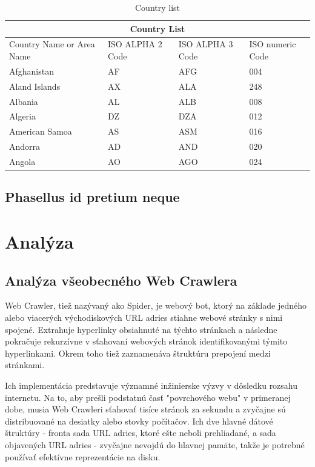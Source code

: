 \begin{table}[!ht]
	\caption{Country list}\label{t:1}
	\smallskip
	\centering

	\begin{tabular}{ |p{3cm}||p{3cm}|p{3cm}|p{3cm}|  }
		\hline
		\multicolumn{4}{|c|}{Country List} \\
		\hline
		Country Name or Area Name& ISO ALPHA 2 Code &ISO ALPHA 3 Code&ISO numeric Code\\
		\hline
		Afghanistan & AF & AFG & 004\\
		Aland Islands & AX & ALA & 248\\
		Albania & AL & ALB & 008\\
		Algeria & DZ & DZA & 012\\
		American Samoa & AS & ASM & 016\\
		Andorra & AD & AND & 020\\
		Angola & AO & AGO & 024\\
		\hline
	\end{tabular}
\end{table}


\section{Phasellus id pretium neque}
\blindtext

\blindtext

\chapter{Analýza}
\section{Analýza všeobecného Web Crawlera}

Web Crawler, tiež nazývaný ako Spider, je webový bot, ktorý na základe jedného alebo viacerých východiskových URL adries stiahne webové stránky s nimi spojené. Extrahuje hyperlinky obsiahnuté na týchto stránkach a následne pokračuje rekurzívne v sťahovaní webových stránok identifikovanými týmito hyperlinkami. Okrem toho tiež zaznamenáva štruktúru prepojení medzi stránkami. \cite{introToInfRetrieval}

Ich implementácia predstavuje významné inžinierske výzvy v dôsledku rozsahu internetu. Na to, aby prešli podstatnú časť "povrchového webu" v primeranej dobe, musia Web Crawleri sťahovať tisíce stránok za sekundu a zvyčajne sú distribuované na desiatky alebo stovky počítačov. Ich dve hlavné dátové štruktúry - fronta sada URL adries, ktoré ešte neboli prehliadané, a sada objavených URL adries - zvyčajne nevojdú do hlavnej pamäte, takže je potrebné používať efektívne reprezentácie na disku. \cite{encykOfDatabases}

